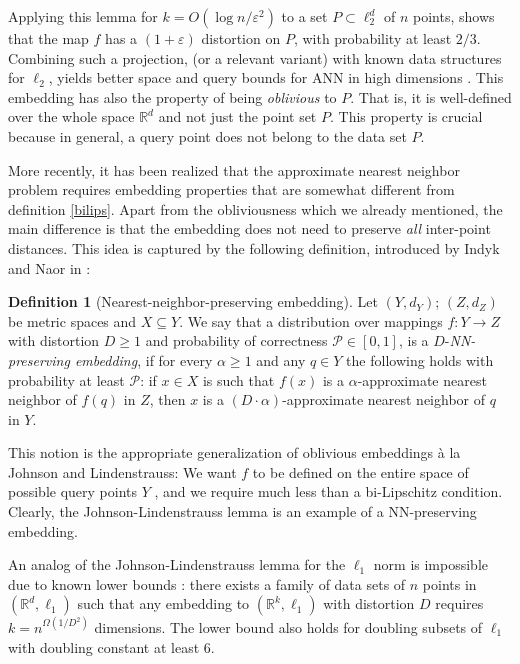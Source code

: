 \documentclass[10pt,a4paper,twoside]{book}
\newcommand{\rd}{\mathbb{R}^{d}}
\newcommand{\rk}{\mathbb{R}^{k}}
\newcommand{\eps}{\varepsilon}
\theoremstyle{definition}
\newtheorem{definition}{Definition}[chapter]
\theoremstyle{remark}
\begin{document}
Applying this lemma for $k = O(\log{n}/ \eps^2)$ to a set $P \subset \ell_2^d$ of $n$ points, shows that the map $f$ has a $(1+\eps)$ distortion on $P$, with probability at least $2/3$. Combining such a projection, (or a relevant variant) with known data structures for $\ell_2$, yields better space and query bounds for ANN in high dimensions \cite{AC09, AEP18}. This embedding has also the property of being \textit{oblivious} to $P$. That is, it is well-defined over the whole space $\rd$ and not just the point set $P$. This property is crucial because in general, a query point does not belong to the data set $P$.

More recently, it has been realized that the approximate nearest neighbor problem requires embedding properties that are somewhat different from definition \ref{bilips}. Apart from the obliviousness which we already mentioned, the main difference is that the embedding does not need to preserve \textit{all} inter-point distances. This idea is captured by the following definition, introduced by Indyk and Naor in \cite{IN07}:

\begin{definition} [Nearest-neighbor-preserving embedding] \label{def:nnpres}
Let $(Y,d_Y)$; $(Z,d_Z)$ be metric spaces and $X \subseteq Y$. We say that a distribution over mappings $f:Y \rightarrow Z$ with distortion $D \geq 1$ and probability of correctness $\mathcal{P} \in [0,1]$, is a $D$-\textit{NN-preserving embedding}, if for every $\alpha \geq 1$ and any $q \in Y$ the following holds with probability at least $\mathcal{P}$: if $x \in X$ is such that $f(x)$ is a $\alpha$-approximate nearest neighbor of $f(q)$ in $Z$, then $x$ is a $(D \cdot \alpha)$-approximate nearest neighbor of $q$ in $Y$.
\end{definition}

This notion is the appropriate generalization of oblivious embeddings \`{a} la Johnson and Lindenstrauss: We want $f$ to be defined on the entire space of possible query points $Y$ , and we require much less than a bi-Lipschitz condition. Clearly, the Johnson-Lindenstrauss lemma is an example of a NN-preserving embedding.

An analog of the Johnson-Lindenstrauss lemma for the $\ell_1$ norm is impossible due to known lower bounds \cite{BC05, LMN05}: there exists a family of data sets of $n$ points in $(\rd,\ell_1)$ such that any embedding to $(\rk, \ell_1)$ with distortion $D$ requires $k = n^{\Omega(1/D^2)}$ dimensions. The lower bound also holds for doubling subsets of $\ell_1$ with doubling constant at least $6$. 
\end{document}
